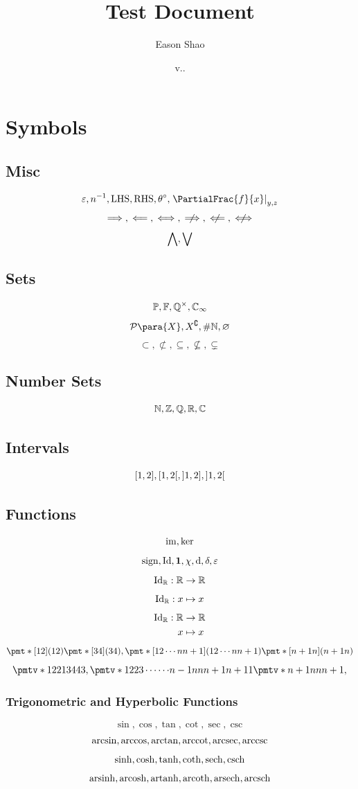 \documentclass{article}
\title{Test Document}
\author{Eason Shao}
\date{v.\DATE.\COMMITSHA}
\begin{document}
\maketitle

\section{Symbols}
\subsection{Misc}
\[
    \epsilon, n\inverse, \LHS, \RHS, \theta\degree, \rightbar{\PartialFrac{f}{x}}_{y, z}
\]
\[
    \implies, \impliedby, \iff, \notimplies, \notimpliedby, \notiff
\]
\[
    \bigwedge, \bigvee
\]

\subsection{Sets}
\[
    \mathbb{P}, \mathbb{F}, \mathbb{Q}^{\times}, \mathbb{C}_{\infty}
\]
\[
    \powerset\para{X}, X\compl, \size\NN, \emptyset
\]
\[
    \subset, \nsubset, \subseteq, \nsubseteq, \subsetneq
\]

\subsection{Number Sets}
\[
    \mathbb{N}, \mathbb{Z}, \mathbb{Q}, \mathbb{R}, \mathbb{C}
\]

\subsection{Intervals}
\[
    \ccintv{1}{2}, \cointv{1}{2}, \ocintv{1}{2}, \oointv{1}{2}
\]

\subsection{Functions}
\[
    \operatorname{im}, \ker
\]
\[
    \operatorname{sign}, \operatorname{Id}, \mathbf{1}, \chi, \dd, \delta, \varepsilon
\]
\[
    \operatorname{Id}_{\mathbb{R}}: \mathbb{R} \to \mathbb{R}
\]
\[
    \operatorname{Id}_{\mathbb{R}}: x \mapsto x
\]
\[
    \begin{aligned} \operatorname{Id}_{\mathbb{R}}: \mathbb{R} &\to \mathbb{R} \\ x &\mapsto x \end{aligned}
\]
\[
    \perm{12} \perm{34}, \perm{{1}{2}\cdots{n}{n + 1}} \perm{{n + 1}n}
\]
\[
    \permverb{1234}{1{2} 2{1} 3{4} 4{3}}, \permverb{12{\cdots}{n - 1}{n}{n + 1}}{1{2} 2{3} \cdots{\cdots} {n - 1}{n} {n}{n + 1} {n + 1}{1}} \permverb{{n}{n + 1}}{{n + 1}{n} {n}{n + 1}},
\]

\subsubsection{Trigonometric and Hyperbolic Functions}
\[
    \sin, \cos, \tan, \cot, \sec, \csc
\]
\[
    \arcsin, \arccos, \arctan, \arccot, \arcsec, \arccsc
\]
\[
    \sinh, \cosh, \tanh, \coth, \sech, \csch
\]
\[
    \operatorname{arsinh}, \operatorname{arcosh}, \operatorname{artanh}, \operatorname{arcoth}, \operatorname{arsech}, \operatorname{arcsch}
\]
\end{document}
